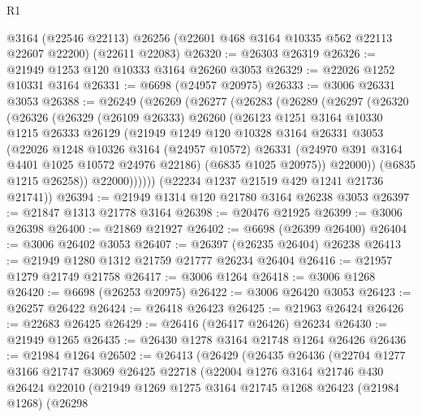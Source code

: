\begin{lexlean}{R1}
\begin{coremodule}
    @3164
    (@22546 @22113)
    @26256
    (@22601 @468 @3164 @10335 @562 @22113 @22607 @22200)
    (@22611 @22083)
@26320 := @26303 @26319
@26326 := @21949 @1253 @120 @10333 @3164 @26260 @3053
@26329 := @22026 @1252 @10331 @3164
@26331 := @6698 (@24957 @20975)
@26333 := @3006 @26331 @3053
@26388 := @26249
    (@26269
      (@26277
        (@26283
          (@26289
            (@26297
              (@26320
                (@26326
                  (@26329
                    (@26109 @26333)
                    @26260
                    (@26123
                      @1251
                      @3164
                      @10330
                      @1215
                      @26333
                      @26129
                      (@21949
                        @1249
                        @120
                        @10328
                        @3164
                        @26331
                        @3053
                        (@22026
                          @1248
                          @10326
                          @3164
                          (@24957 @10572)
                          @26331
                          (@24970 @391 @3164 @4401 @1025 @10572 @24976 @22186)
                          (@6835 @1025 @20975))
                        @22000))
                    (@6835 @1215 @26258))
                  @22000))))))
      (@22234 @1237 @21519 @429 @1241 @21736 @21741))
@26394 := @21949 @1314 @120 @21780 @3164 @26238 @3053
@26397 := @21847 @1313 @21778 @3164
@26398 := @20476 @21925
@26399 := @3006 @26398
@26400 := @21869 @21927
@26402 := @6698 (@26399 @26400)
@26404 := @3006 @26402 @3053
@26407 := @26397 (@26235 @26404) @26238
@26413 := @21949 @1280 @1312 @21759 @21777 @26234 @26404
@26416 := @21957 @1279 @21749 @21758
@26417 := @3006 @1264
@26418 := @3006 @1268
@26420 := @6698 (@26253 @20975)
@26422 := @3006 @26420 @3053
@26423 := @26257 @26422
@26424 := @26418 @26423
@26425 := @21963 @26424
@26426 := @22683 @26425
@26429 := @26416 (@26417 @26426) @26234
@26430 := @21949 @1265
@26435 := @26430 @1278 @3164 @21748 @1264 @26426
@26436 := @21984 @1264
@26502 := @26413
    (@26429
      (@26435
        @26436
        (@22704
          @1277
          @3166
          @21747
          @3069
          @26425
          @22718
          (@22004
            @1276
            @3164
            @21746
            @430
            @26424
            @22010
            (@21949
              @1269
              @1275
              @3164
              @21745
              @1268
              @26423
              (@21984 @1268)
              (@26298

\end{coremodule}
\end{lexlean}
